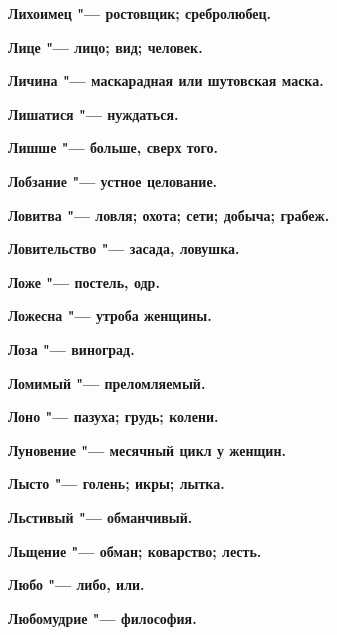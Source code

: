 \begin{mymulticols}{2}
\bfseries Лихоимец\normalfont{} "--- ростовщик; сребролюбец. 




\bfseries Лице\normalfont{} "--- лицо; вид; человек. 




\bfseries Личина\normalfont{} "--- маскарадная или шутовская маска. 




\bfseries Лишатися\normalfont{} "--- нуждаться. 




\bfseries Лишше\normalfont{} "--- больше, сверх того. 




\bfseries Лобзание\normalfont{} "--- устное целование. 




\bfseries Ловитва\normalfont{} "--- ловля; охота; сети; добыча; грабеж. 




\bfseries Ловительство\normalfont{} "--- засада, ловушка. 




\bfseries Ложе\normalfont{} "--- постель, одр. 




\bfseries Ложесна\normalfont{} "--- утроба женщины. 




\bfseries Лоза\normalfont{} "--- виноград. 




\bfseries Ломимый\normalfont{} "--- преломляемый. 




\bfseries Лоно\normalfont{} "--- пазуха; грудь; колени. 




\bfseries Луновение\normalfont{} "--- месячный цикл у женщин. 




\bfseries Лысто\normalfont{} "--- голень; икры; лытка. 




\bfseries Льстивый\normalfont{} "--- обманчивый. 




\bfseries Льщение\normalfont{} "--- обман; коварство; лесть. 




\bfseries Любо\normalfont{} "--- либо, или. 




\bfseries Любомудрие\normalfont{} "--- философия. 





\end{mymulticols}
